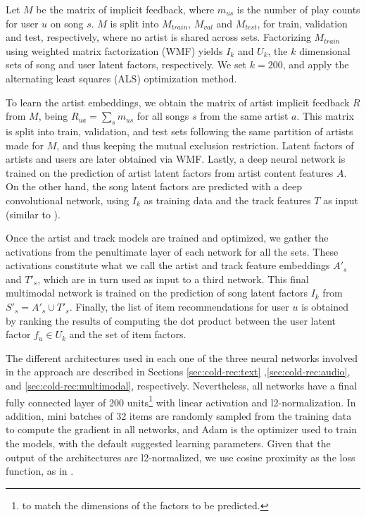 Let $M$ be the matrix of implicit feedback, where $m_{us}$ is the number of play counts for user $u$ on song $s$. 
$M$ is split into $M_{train}$, $M_{val}$ and $M_{test}$, for train, validation and test, respectively, where no artist is shared across sets. 
Factorizing $M_{train}$ using weighted matrix factorization (WMF) \cite{Hu2008} yields $I_{k}$ and $U_{k}$, the $k$ dimensional sets of song and user latent factors, respectively.
We set $k=200$, and apply the alternating least squares (ALS) optimization method.%


To learn the artist embeddings, we obtain the matrix of artist implicit feedback $R$ from $M$, being $R_{ua} = \sum_{s}m_{us}$ for all songs $s$ from the same artist $a$. This matrix is split into train, validation, and test sets following the same partition of artists made for $M$, and thus keeping the mutual exclusion restriction. 
Latent factors of artists and users are later obtained via WMF. 
Lastly, a deep neural network is trained on the prediction of artist latent factors from artist content features $A$.
On the other hand, the song latent factors are predicted with a deep convolutional network, using $I_{k}$ as training data and the track features $T$ as input (similar to \cite{Oord2013}).

Once the artist and track models are trained and optimized, we gather the activations from the penultimate layer of each network for all the sets. These activations constitute what we call the artist and track feature embeddings $A'_{s}$ and $T'_{s}$, which are in turn used as input to a third network. 
This final multimodal network is trained on the prediction of song latent factors $I_{k}$ from $S'_{s} = A'_{s} \cup T'_{s}$.
Finally, the list of item recommendations for user $u$ is obtained by ranking the results of computing the dot product between the user latent factor $f_{u} \in U_{k}$ and the set of item factors. %


The different architectures used in each one of the three neural networks involved in the approach are described in Sections \ref{sec:cold-rec:text} ,\ref{sec:cold-rec:audio}, and \ref{sec:cold-rec:multimodal}, respectively.
Nevertheless, all networks have a final fully connected layer of 200 units\footnote{to match the dimensions of the factors to be predicted.} with linear activation and l2-normalization. 
In addition, mini batches of 32 items are randomly sampled from the training data to compute the gradient in all networks, and Adam \cite{KingmaB14} is the optimizer used to train the models, with the default suggested learning parameters. 
Given that the output of the architectures are l2-normalized, we use cosine proximity as the loss function, as in \cite{Chollet2016}.

